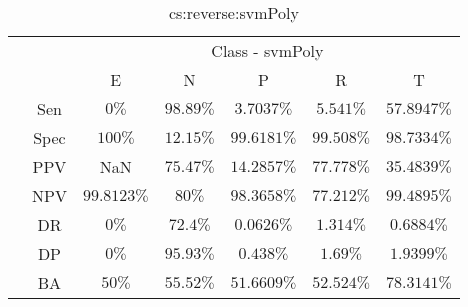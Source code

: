 \begin{table}[!ht]
	\centering
	\begin{tabular}{|c|c|c|c|c|c|c|}
		\cline{3-7}
		\multicolumn{2}{c|}{} & \multicolumn{5}{c|}{Class - svmPoly} \\ \cline{3-7}
		\multicolumn{2}{c|}{} & E & N & P & R & T \\ \hline
		\multirow{7}{*}{\rotatebox{90}{Statistics}} & Sen & $0\%$ & $98.89\%$ & $3.7037\%$ & $5.541\%$ & $57.8947\%$ \\ \cline{2-7}
		 & Spec & $100\%$ & $12.15\%$ & $99.6181\%$ & $99.508\%$ & $98.7334\%$ \\ \cline{2-7}
		 & PPV & NaN & $75.47\%$ & $14.2857\%$ & $77.778\%$ & $35.4839\%$ \\ \cline{2-7}
		 & NPV & $99.8123\%$ & $80\%$ & $98.3658\%$ & $77.212\%$ & $99.4895\%$ \\ \cline{2-7}
		 & DR & $0\%$ & $72.4\%$ & $0.0626\%$ & $1.314\%$ & $0.6884\%$ \\ \cline{2-7}
		 & DP & $0\%$ & $95.93\%$ & $0.438\%$ & $1.69\%$ & $1.9399\%$ \\ \cline{2-7}
		 & BA & $50\%$ & $55.52\%$ & $51.6609\%$ & $52.524\%$ & $78.3141\%$ \\ \hline
	\end{tabular}
	\caption{cs:reverse:svmPoly}
	\label{tab:cs:reverse:svmPoly}
\end{table}
